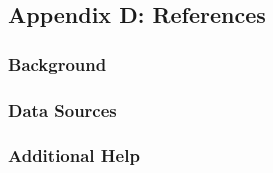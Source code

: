 \documentclass[
  12pt,
]{article}
\begin{document}
\newpage

\subsection{Appendix D: References}\label{appendix-d-references}

\subsubsection{Background}\label{background}

\subsubsection{Data Sources}\label{data-sources-1}

\subsubsection{Additional Help}\label{additional-help}
\end{document}
